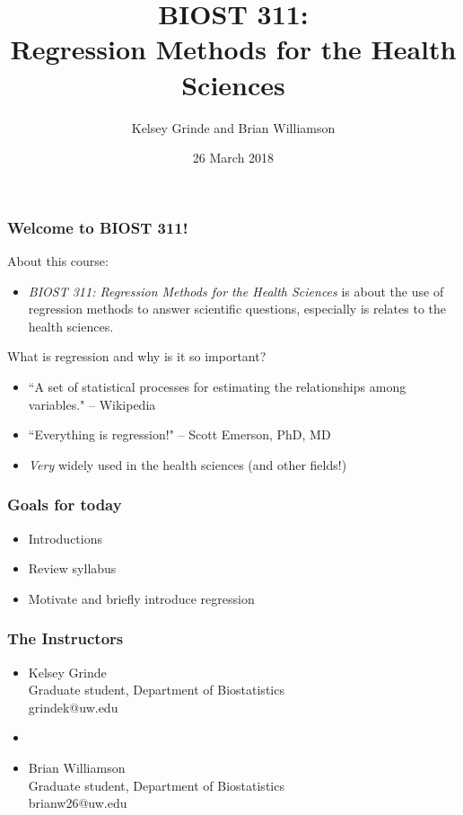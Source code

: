 \documentclass[12pt, 
hyperref={colorlinks=true, linkcolor=blue, urlcolor=cyan}]{beamer}
\title{BIOST 311: \\ Regression Methods for the Health Sciences}
\author{Kelsey Grinde and Brian Williamson}
\institute{UW Biostatistics}
\date{26 March 2018}
\begin{document}
\begin{frame}
\titlepage\thispagestyle{empty}
\end{frame}


\setcounter{framenumber}{\value{day1}}

\begin{frame}
\frametitle{Welcome to BIOST 311!}

About this course:
\begin{itemize}
\item[] \textit{BIOST 311: Regression Methods for the Health Sciences} is about the use of regression methods to answer scientific questions, especially is relates to the health sciences.
\end{itemize}

What is regression and why is it so important?
\begin{itemize}
\item ``A set of statistical processes for estimating the relationships among variables." -- Wikipedia
\item ``Everything is regression!" -- Scott Emerson, PhD, MD
\item \textit{Very} widely used in the health sciences (and other fields!)
\end{itemize}

\end{frame}

\begin{frame}
\frametitle{Goals for today}

\begin{itemize}
\item Introductions
\item Review syllabus
\item Motivate and briefly introduce regression
\end{itemize}

\end{frame}

\begin{frame}
\frametitle{The Instructors}
\begin{itemize}
\item[] Kelsey Grinde \\ Graduate student, Department of Biostatistics \\ grindek@uw.edu 
\item[]
\item[] Brian Williamson \\ Graduate student, Department of Biostatistics \\ brianw26@uw.edu
\end{itemize}
\end{frame}
\end{document}
